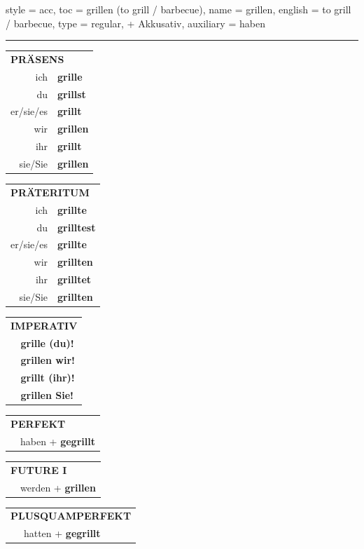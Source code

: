 \begin{verbentry}{
  style = {acc},
  toc = {grillen (to grill / barbecue)},
  name = {grillen},
  english = {to grill / barbecue},
  type = {regular, + Akkusativ},
  auxiliary = {haben}
}


\vspace{5pt}
\hrule
\vspace{5pt}

\begin{tabular}{rl}
\multicolumn{2}{l}{\textbf{PRÄSENS}}\\
ich & \textbf{grille}\\
du & \textbf{grillst}\\
er/sie/es & \textbf{grillt}\\
wir & \textbf{grillen}\\
ihr & \textbf{grillt}\\
sie/Sie & \textbf{grillen}\\
\end{tabular}
\hfill
\begin{tabular}{rl}
\multicolumn{2}{l}{\textbf{PRÄTERITUM}}\\
ich & \textbf{grillte}\\
du & \textbf{grilltest}\\
er/sie/es & \textbf{grillte}\\
wir & \textbf{grillten}\\
ihr & \textbf{grilltet}\\
sie/Sie & \textbf{grillten}\\
\end{tabular}
\hfill
\begin{tabular}{rl}
\multicolumn{2}{l}{\textbf{IMPERATIV}}\\
& \textbf{grille (du)!}\\
& \textbf{grillen wir!}\\
& \textbf{grillt (ihr)!}\\
& \textbf{grillen Sie!}\\
\end{tabular}

\vspace{10pt}

\begin{tabular}{rl}
\multicolumn{2}{l}{\textbf{PERFEKT}}\\
& haben + \textbf{gegrillt}\\
\end{tabular}
\hfill
\begin{tabular}{rl}
\multicolumn{2}{l}{\textbf{FUTURE I}}\\
& werden + \textbf{grillen}\\
\end{tabular}
\hfill
\begin{tabular}{rl}
\multicolumn{2}{l}{\textbf{PLUSQUAMPERFEKT}}\\
& hatten + \textbf{gegrillt}\\
\end{tabular}


\end{verbentry}
